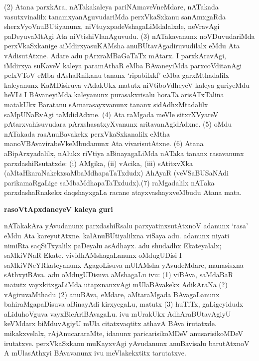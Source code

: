 (2) Atana parxkAra, nATakakaleya pariNAmaveVneMdare, nATakada vasutxvinalilx tanamxya\-nAguvudariMda perxVkaSxkanu sanAmxgaRda sherxVyoVnuBUtiyanunx, niVtuyxpadeVshagaLiMdalalxde, neVravAgi paDeyuvaMtAgi Ata niVtishiVlanAguvudu. (3) nATakavanunx noVDuvuda\-riMda perxVkaSxkanige aiMdirxyasuKAMsha anuBUtavAgadiruvudilalx eMdu Ata vAdisu\-tAtxne. Adare adu pArxraMBaGaTaTx mAtarx. I parxkAravAgi, iMdirxya suKaveV kaleya paramAthaR eMba BAvaneyiMda parxcoVditanAgi pelxVToV eMba dAshaRnikanu tananx `ripabilxkf' eMba garxMthadalilx kaleyanunx KaMDisiruva vAdakUkx matutx niVtiboVdheyeV kaleya guriyeMdu heVLi I BAvaneyiMda kaleyanunx purasakxrisalu horaTa arisATxTa\-lina matakUkx Baratanu sAmarasayxvanunx tananx sidAdhxMtadalilx saMpUNaRvAgi taMdidAdxne. (4) Ata raMgada meVle sitxrXVyareV pAtarxvahisuvudara pArxshasatxyXvanunx aritavanAgidAdxne. (5) oMdu nATakada rasAnuBavakekx perxVkaSxkanalilx eMtha manoVBAvavirabeVkeMbu\-danunx Ata vivarisutAtxne. (6) Atana aBipArxyadalilx, nAlukx riVtiya aBinayagaLiMda nATaka tananx rasavanunx parxdashiRsutatxde: {\rm(i)} AMgika, {\rm(ii)} vAcika, {\rm(iii)} sAtitxvXka (aMtaHkaraNakekx\break saMbaMdhapaTaTxdudx) AhAyaR (veVSaBUSaNAdi parikamaRgaLige saMbaMdhapaTaTxdudx).\break (7) raMgadalilx nATaka parxdashaRnakekx daqshayxgaLa racane atayxvashayxveMbudu Atana mata.

\bigskip
\begin{center}
{\Large\bf rasoVtApxdaneyeV kaleya guri}
\end{center}

nATakakAra yAvudanunx parxdashiRsalu parxyatinxsutAtxnoV adanunx `rasa' eMdu Ata kareyutAtxne. kalAnuBUtiyalilxna viSaya adu. adanunx niyati nimiRta saqSiTxyalilx paDeyalu asAdhayx. adu shudadhx Ekateyalalx; saMkiVNaR Ekate. vividhAMshagaLanunx oMdugUDisi I saMkiVNeYRkateyanunx AgagoLisuva mUlAMsha yAvudeMdare, manasisxna sAthxyiBAva. adu oMdugUDisuva aMshagaLu ivu: (1) viBAva, saMdaBaR matutx vayxkitxgaLiMda utapxnanxvAgi mUlaBAvakekx AdikAraNa (?) vAgiruvaMthadu (2) anuBAva, eMdare, aMtaraMgada BAvagaLanunx bahiraMgapaDisuva aBinayAdi kirxyegaLu, matutx (3) huTiTx, gaLigeyidudx aLiduhoVguva vayxBicAriBAvagaLu. ivu mUrakUkx AdhAraBUtavAgiyU keVMdarx biMduvAgiyU mUla citatxvaqtitx athavA BAva irutatxde. mikakxvelalx, rAjAnucararaMte, idanunx paricarisikoMDeV anusarisikoMDeV irutatxve. perxVkaSxkanu muKayxvAgi yAvudanunx anuBavisalu barutAtxnoV A mUlasAthxyi BAvavanunx ivu meVlakekxtitx tarutatxve.

